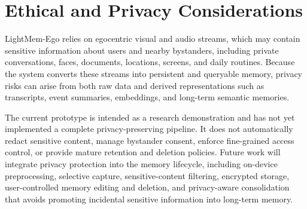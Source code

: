 \section*{Ethical and Privacy Considerations}

LightMem-Ego relies on egocentric visual and audio streams, which may contain sensitive information about users and nearby bystanders, including private conversations, faces, documents, locations, screens, and daily routines. 
Because the system converts these streams into persistent and queryable memory, privacy risks can arise from both raw data and derived representations such as transcripts, event summaries, embeddings, and long-term semantic memories.

The current prototype is intended as a research demonstration and has not yet implemented a complete privacy-preserving pipeline. 
It does not automatically redact sensitive content, manage bystander consent, enforce fine-grained access control, or provide mature retention and deletion policies. 
Future work will integrate privacy protection into the memory lifecycle, including on-device preprocessing, selective capture, sensitive-content filtering, encrypted storage, user-controlled memory editing and deletion, and privacy-aware consolidation that avoids promoting incidental sensitive information into long-term memory.